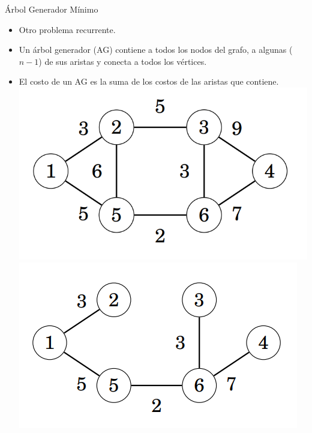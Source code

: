 \documentclass{beamer}
\begin{document}
\begin{frame}{Árbol Generador Mínimo}
	\begin{itemize}
		\item Otro problema recurrente.
		\item Un árbol generador (AG) contiene a todos los nodos del grafo, a algunas ($n-1$) de sus aristas y conecta a todos los vértices.
		\item El costo de un AG es la suma de los costos de las aristas que contiene.
		\includegraphics[scale=0.30]{figuras/grafo-kruskal-1.PNG}
		\includegraphics[scale=0.42]{figuras/grafo-kruskal-2.PNG}
	\end{itemize}
\end{frame}
\end{document}
